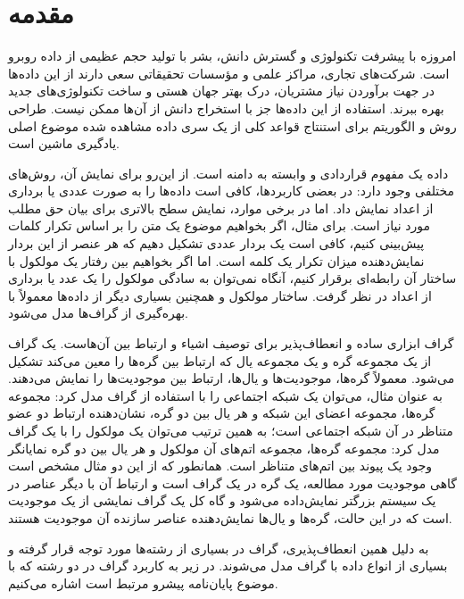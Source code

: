\clearpage
{}
\chapter*{مقدمه}

امروزه با پیشرفت تکنولوژی و گسترش دانش، بشر با تولید حجم عظیمی از داده روبرو است. شرکت‌های تجاری، مراکز علمی و مؤسسات تحقیقاتی سعی دارند از این داده‌ها در جهت برآوردن نیاز مشتریان، درک بهتر جهان هستی و ساخت تکنولوژی‌های جدید بهره ببرند. استفاده از این داده‌ها جز با استخراج دانش از آن‌ها ممکن نیست. طراحی روش و الگوریتم  برای استنتاج قواعد کلی از یک سری داده مشاهده شده موضوع اصلی یادگیری ماشین است.

داده یک مفهوم قراردادی و وابسته به دامنه است. از این‌رو برای نمایش آن، روش‌های مختلفی وجود دارد: در بعضی کاربردها، کافی است داده‌ها را به صورت عددی یا برداری از اعداد نمایش داد. اما در برخی موارد، نمایش سطح بالاتری برای بیان حق مطلب مورد نیاز است. برای مثال، اگر بخواهیم موضوع یک متن را بر اساس تکرار کلمات پیش‌بینی کنیم، کافی است یک بردار عددی تشکیل دهیم که هر عنصر از این بردار نمایش‌دهنده میزان تکرار یک کلمه است. اما اگر بخواهیم بین رفتار یک مولکول با ساختار آن رابطه‌ای برقرار کنیم، آنگاه نمی‌توان به سادگی مولکول را یک عدد یا برداری از اعداد در نظر گرفت. ساختار مولکول و همچنین بسیاری دیگر از داده‌ها معمولاً با بهره‌گیری از گراف‌ها مدل می‌شود.

گراف ابزاری ساده و انعطاف‌پذیر برای توصیف اشیاء و ارتباط بین آن‌هاست. یک گراف از یک مجموعه گره‌ و یک مجموعه یال‌ که ارتباط بین گره‌ها را معین می‌کند تشکیل می‌شود. معمولاً  گره‌ها، موجودیت‌ها و یال‌ها، ارتباط بین موجودیت‌ها را نمایش می‌دهند. به عنوان مثال، می‌توان یک شبکه اجتماعی را با استفاده از گراف مدل کرد: مجموعه گره‌ها، مجموعه اعضای این شبکه و هر یال بین دو گره، نشان‌دهنده ارتباط دو عضو متناظر در آن شبکه اجتماعی است؛ به همین ترتیب می‌توان یک مولکول را با یک گراف مدل کرد: مجموعه گره‌ها، مجموعه اتم‌های آن مولکول و هر یال بین دو گره نمایانگر وجود یک پیوند بین اتم‌های متناظر است. همانطور که از این دو مثال مشخص است گاهی موجودیت مورد مطالعه، یک گره در یک گراف است و ارتباط آن با دیگر عناصر در یک سیستم بزرگتر نمایش‌داده می‌شود و گاه کل یک گراف نمایشی از یک موجودیت است که در این حالت، گره‌ها و یال‌ها نمایش‌دهنده عناصر سازنده آن موجودیت هستند.

به دلیل همین انعطاف‌پذیری، گراف در بسیاری از رشته‌ها مورد توجه قرار گرفته و بسیاری از انواع داده با گراف مدل می‌شوند. در زیر به کاربرد گراف در دو رشته که با موضوع پایان‌نامه پیشرو مرتبط است اشاره می‌کنیم.

